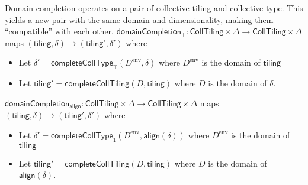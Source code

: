 Domain completion operates on a pair of collective tiling and collective type.
This yields a new pair with the same domain and dimensionality, making them ``compatible'' with each other.
\filbreak
$\mathsf{domainCompletion_\top} : \mathsf{CollTiling} \times \Delta \to \mathsf{CollTiling} \times \Delta$
maps $(\mathsf{tiling}, \delta) \to (\mathsf{tiling}', \delta')$ where
\begin{itemize}
  \item Let $\delta' = \mathsf{completeCollType}_\top(D^\text{env}, \delta)$
    where $D^\text{env}$ is the domain of $\mathsf{tiling}$
  \filbreak
  \item Let $\mathsf{tiling}' = \mathsf{completeCollTiling}(D, \mathsf{tiling})$
    where $D$ is the domain of $\delta$.
\end{itemize}
\filbreak
$\mathsf{domainCompletion_{align}} : \mathsf{CollTiling} \times \Delta \to \mathsf{CollTiling} \times \Delta$
maps $(\mathsf{tiling}, \delta) \to (\mathsf{tiling}', \delta')$ where
\begin{itemize}
  \item Let $\delta' = \mathsf{completeCollType}_1(D^\text{env}, \mathsf{align}(\delta))$
    where $D^\text{env}$ is the domain of $\mathsf{tiling}$
  \filbreak
  \item Let $\mathsf{tiling}' = \mathsf{completeCollTiling}(D, \mathsf{tiling})$
    where $D$ is the domain of $\mathsf{align}(\delta)$.
\end{itemize}

\filbreak
{}

